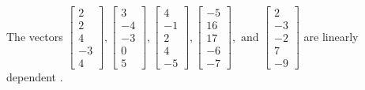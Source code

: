 \begin{exercise}
\begin{exerciseStatement}
  \end{exerciseStatement}
  \begin{exerciseAnswer}
   The vectors \(\left[\begin{array}{r}
2 \\
2 \\
4 \\
-3 \\
4
\end{array}\right] , \left[\begin{array}{r}
3 \\
-4 \\
-3 \\
0 \\
5
\end{array}\right] , \left[\begin{array}{r}
4 \\
-1 \\
2 \\
4 \\
-5
\end{array}\right] , \left[\begin{array}{r}
-5 \\
16 \\
17 \\
-6 \\
-7
\end{array}\right] , \text{ and } \left[\begin{array}{r}
2 \\
-3 \\
-2 \\
7 \\
-9
\end{array}\right]\) are 
  	 linearly dependent  .
  


  \end{exerciseAnswer}
\end{exercise}